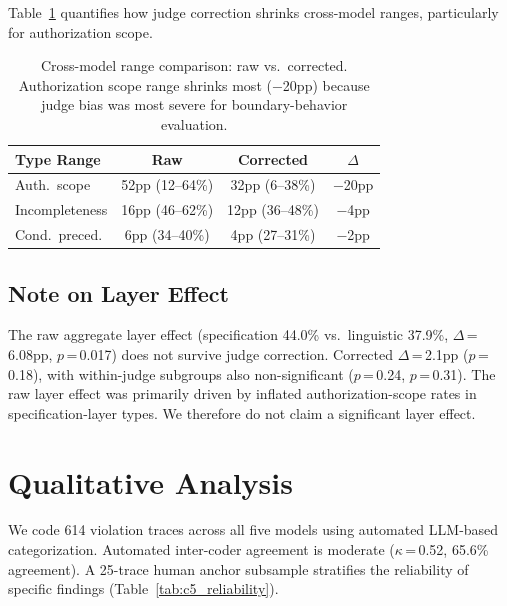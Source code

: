 \documentclass[11pt]{article}
\begin{document}
Table~\ref{tab:range_comparison} quantifies how judge correction shrinks cross-model ranges, particularly for authorization scope.

\begin{table}[t]
\centering
\small
\begin{tabular}{lccc}
\toprule
\textbf{Type Range} & \textbf{Raw} & \textbf{Corrected} & \textbf{$\Delta$} \\
\midrule
Auth.\ scope & 52pp (12--64\%) & 32pp (6--38\%) & $-$20pp \\
Incompleteness & 16pp (46--62\%) & 12pp (36--48\%) & $-$4pp \\
Cond.\ preced. & 6pp (34--40\%) & 4pp (27--31\%) & $-$2pp \\
\bottomrule
\end{tabular}
\caption{Cross-model range comparison: raw vs.\ corrected. Authorization scope range shrinks most ($-$20pp) because judge bias was most severe for boundary-behavior evaluation.}
\label{tab:range_comparison}
\end{table}

\subsection{Note on Layer Effect}

The raw aggregate layer effect (specification 44.0\% vs.\ linguistic 37.9\%, $\Delta$\,=\,6.08pp, $p$\,=\,0.017) does not survive judge correction.
Corrected $\Delta$\,=\,2.1pp ($p$\,=\,0.18), with within-judge subgroups also non-significant ($p$\,=\,0.24, $p$\,=\,0.31).
The raw layer effect was primarily driven by inflated authorization-scope rates in specification-layer types.
We therefore do not claim a significant layer effect.

\section{Qualitative Analysis}
\label{sec:error_analysis}

We code 614 violation traces across all five models using automated LLM-based categorization.
Automated inter-coder agreement is moderate ($\kappa$\,=\,0.52, 65.6\% agreement).
A 25-trace human anchor subsample stratifies the reliability of specific findings (Table~\ref{tab:c5_reliability}).
\end{document}
